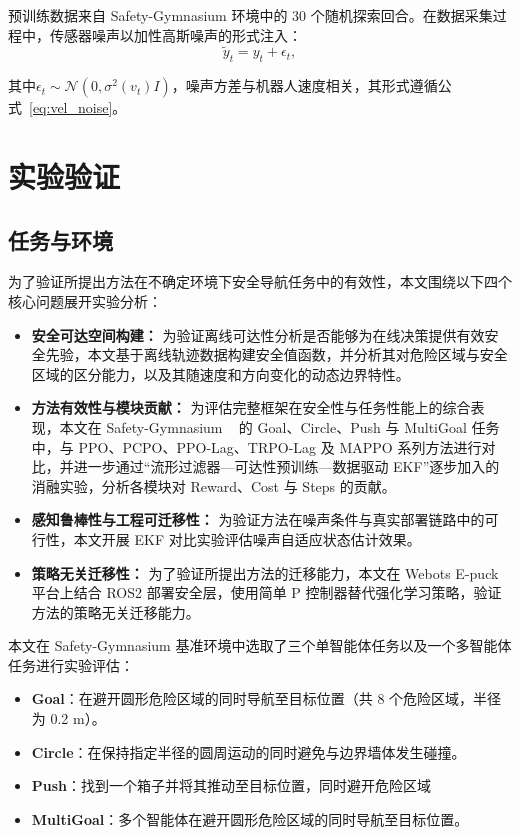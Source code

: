 预训练数据来自 Safety-Gymnasium 环境中的 30 个随机探索回合。在数据采集过程中，传感器噪声以加性高斯噪声的形式注入：
\begin{equation}
    \tilde{y}_t = y_t + \epsilon_t,
\end{equation}

其中$\epsilon_t \sim \mathcal{N}(0, \sigma^2(v_t)I)$，噪声方差与机器人速度相关，其形式遵循公式~\eqref{eq:vel_noise}。

\section{实验验证}

\subsection{任务与环境}
为了验证所提出方法在不确定环境下安全导航任务中的有效性，本文围绕以下四个核心问题展开实验分析：
\begin{itemize}
    \item \textbf{安全可达空间构建：}
    为验证离线可达性分析是否能够为在线决策提供有效安全先验，本文基于离线轨迹数据构建安全值函数，并分析其对危险区域与安全区域的区分能力，以及其随速度和方向变化的动态边界特性。

    \item \textbf{方法有效性与模块贡献：}
    为评估完整框架在安全性与任务性能上的综合表现，本文在 Safety-Gymnasium ~\cite{ray2019benchmarking,ji2023safety_gymnasium,ji2024omnisafe} 的 Goal、Circle、Push 与 MultiGoal 任务中，与 PPO、PCPO、PPO-Lag、TRPO-Lag 及 MAPPO 系列方法进行对比，并进一步通过“流形过滤器—可达性预训练—数据驱动 EKF”逐步加入的消融实验，分析各模块对 Reward、Cost 与 Steps 的贡献。

    \item \textbf{感知鲁棒性与工程可迁移性：}
    为验证方法在噪声条件与真实部署链路中的可行性，本文开展 EKF 对比实验评估噪声自适应状态估计效果。
    
    \item \textbf{策略无关迁移性：}
    为了验证所提出方法的迁移能力，本文在 Webots E-puck 平台上结合 ROS2 部署安全层，使用简单 P 控制器替代强化学习策略，验证方法的策略无关迁移能力。
\end{itemize}

本文在 Safety-Gymnasium 基准环境中选取了三个单智能体任务以及一个多智能体任务进行实验评估：
\begin{itemize}
\item \textbf{Goal}：在避开圆形危险区域的同时导航至目标位置（共 8 个危险区域，半径为 0.2 m）。
\item \textbf{Circle}：在保持指定半径的圆周运动的同时避免与边界墙体发生碰撞。
\item \textbf{Push}：找到一个箱子并将其推动至目标位置，同时避开危险区域
\item \textbf{MultiGoal}：多个智能体在避开圆形危险区域的同时导航至目标位置。
\end{itemize}


